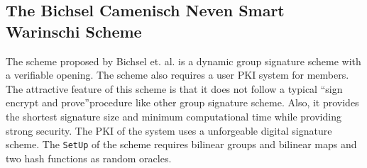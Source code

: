 \subsection{The Bichsel Camenisch Neven Smart Warinschi Scheme}\label{BCNSW}
The scheme proposed by Bichsel et. al. is a dynamic group signature scheme with a verifiable opening\cite{bichsel2010get}. The scheme also requires a user PKI system for members. The attractive feature of this scheme is that it does not follow a typical \textquotedblleft sign encrypt and prove\textquotedblright procedure like other group signature scheme. Also, it provides the shortest signature size and minimum computational time while providing strong security. The PKI of the system uses a unforgeable digital signature scheme. The \texttt{SetUp} of the scheme requires bilinear groups and bilinear maps and two hash functions as random oracles. 

